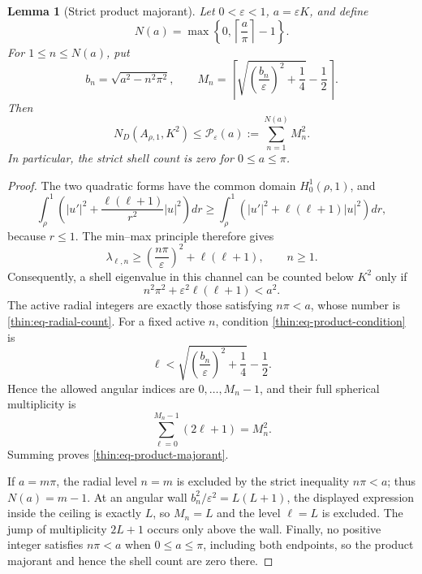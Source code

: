 \documentclass[11pt]{article}
\numberwithin{equation}{section}
\newtheorem{lemma}[theorem]{Lemma}
\theoremstyle{definition}
\theoremstyle{remark}
\begin{document}
\begin{lemma}[Strict product majorant]
\label{thin:lem-product-majorant}
Let \(0<\varepsilon<1\), \(a=\varepsilon K\), and define
\begin{equation}
  N(a)=\max\left\{0,\left\lceil\frac a\pi\right\rceil-1\right\}.
  \label{thin:eq-radial-count}
\end{equation}
For \(1\leq n\leq N(a)\), put
\[
  b_n=\sqrt{a^2-n^2\pi^2},
  \qquad
  M_n=
  \left\lceil
  \sqrt{\left(\frac{b_n}{\varepsilon}\right)^2+\frac14}
  -\frac12
  \right\rceil.
\]
Then
\begin{equation}
  N_D(A_{\rho,1},K^2)
  \leq \mathcal P_\varepsilon(a)
  :=\sum_{n=1}^{N(a)}M_n^2.
  \label{thin:eq-product-majorant}
\end{equation}
In particular, the strict shell count is zero for \(0\leq a\leq\pi\).
\end{lemma}

\begin{proof}
The two quadratic forms have the common domain \(H_0^1(\rho,1)\), and
\[
  \int_\rho^1\left(
     |u'|^2+\frac{\ell(\ell+1)}{r^2}|u|^2
  \right)dr
  \geq
  \int_\rho^1\left(|u'|^2+\ell(\ell+1)|u|^2\right)dr,
\]
because \(r\leq1\).  The min--max principle therefore gives
\[
  \lambda_{\ell,n}
  \geq \left(\frac{n\pi}{\varepsilon}\right)^2
       +\ell(\ell+1),
  \qquad n\geq1.
\]
Consequently, a shell eigenvalue in this channel can be counted below
\(K^2\) only if
\begin{equation}
  n^2\pi^2+\varepsilon^2\ell(\ell+1)<a^2.
  \label{thin:eq-product-condition}
\end{equation}
The active radial integers are exactly those satisfying \(n\pi<a\), whose
number is \eqref{thin:eq-radial-count}.  For a fixed active \(n\), condition
\eqref{thin:eq-product-condition} is
\[
  \ell<
  \sqrt{\left(\frac{b_n}{\varepsilon}\right)^2+\frac14}-\frac12.
\]
Hence the allowed angular indices are
\(0,\ldots,M_n-1\), and their full spherical multiplicity is
\[
  \sum_{\ell=0}^{M_n-1}(2\ell+1)=M_n^2.
\]
Summing proves \eqref{thin:eq-product-majorant}.

If \(a=m\pi\), the radial level \(n=m\) is excluded by the strict
inequality \(n\pi<a\); thus \(N(a)=m-1\).  At an angular wall
\(b_n^2/\varepsilon^2=L(L+1)\), the displayed expression inside the ceiling
is exactly \(L\), so \(M_n=L\) and the level \(\ell=L\) is excluded.  The
jump of multiplicity \(2L+1\) occurs only above the wall.  Finally, no
positive integer satisfies \(n\pi<a\) when \(0\leq a\leq\pi\), including
both endpoints, so the product majorant and hence the shell count are zero
there.
\end{proof}
\end{document}
